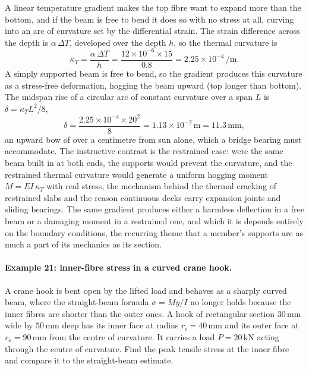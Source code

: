 A linear temperature gradient makes the top fibre want to expand more than
the bottom, and if the beam is free to bend it does so with no stress at
all, curving into an arc of curvature set by the differential strain. The
strain difference across the depth is $\alpha\,\Delta T$, developed over
the depth $h$, so the thermal curvature is
\[
\kappa_T = \frac{\alpha\,\Delta T}{h}
= \frac{12 \times 10^{-6} \times 15}{0.8}
= 2.25 \times 10^{-4}\,\si{\per\meter}.
\]
A simply supported beam is free to bend, so the gradient produces this
curvature as a stress-free deformation, hogging the beam upward (top
longer than bottom). The midspan rise of a circular arc of constant
curvature over a span $L$ is $\delta = \kappa_T L^2/8$,
\[
\delta = \frac{2.25 \times 10^{-4} \times 20^2}{8}
= 1.13 \times 10^{-2}\,\si{\meter} = 11.3\,\si{\milli\meter},
\]
an upward bow of over a centimetre from sun alone, which a bridge bearing
must accommodate. The instructive contrast is the restrained case: were
the same beam built in at both ends, the supports would prevent the
curvature, and the restrained thermal curvature would generate a uniform
hogging moment $M = EI\,\kappa_T$ with real stress, the mechanism behind
the thermal cracking of restrained slabs and the reason continuous decks
carry expansion joints and sliding bearings. The same gradient produces
either a harmless deflection in a free beam or a damaging moment in a
restrained one, and which it is depends entirely on the boundary
conditions, the recurring theme that a member's supports are as much a
part of its mechanics as its section.

\paragraph{Example 21: inner-fibre stress in a curved crane hook.} A
crane hook is bent open by the lifted load and behaves as a sharply
curved beam, where the straight-beam formula $\sigma=My/I$ no longer
holds because the inner fibres are shorter than the outer ones. A hook
of rectangular section $30\,\si{\milli\meter}$ wide by $50\,\si{\milli
\meter}$ deep has its inner face at radius $r_i = 40\,\si{\milli\meter}$
and its outer face at $r_o = 90\,\si{\milli\meter}$ from the centre of
curvature. It carries a load $P = 20\,\text{kN}$ acting through the
centre of curvature. Find the peak tensile stress at the inner fibre and
compare it to the straight-beam estimate.

